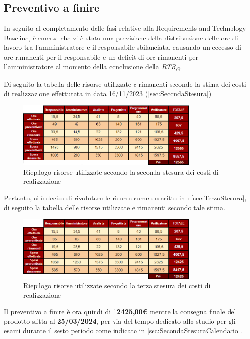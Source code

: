 \subsection{Preventivo a finire}
In seguito al completamento delle fasi relative alla Requirements and Technology Baseline, è emerso che vi è stata una previsione della distribuzione delle ore di lavoro tra l'amministratore e il responsabile sbilanciata, causando un eccesso di ore rimanenti per il responsabile e un deficit di ore rimanenti per l'amministratore al momento della conclusione della \textit{RTB}\textsubscript{\textit{G}}.

Di seguito la tabella delle risorse utilizzate e rimanenti secondo la stima dei costi di realizzazione effettutata in data 16/11/2023 (\ref{sec:SecondaStesura})
\begin{figure}[H]
    \centering
    \includegraphics[width=0.8\textwidth]{../Images/PaF1stesura.PNG}
    \caption{Riepilogo risorse utilizzate secondo la seconda stesura dei costi di realizzazione}
    \label{fig:RisorseRimanentiRTB}
\end{figure}

Pertanto, si è deciso di rivalutare le risorse come descritto in : \ref{sec:TerzaStesura},
di seguito la tabella delle risorse utilizzate e rimanenti secondo tale stima.

\begin{figure}[H]
    \centering
    \includegraphics[width=0.8\textwidth]{../Images/PaF2stesura.PNG}
    \caption{Riepilogo risorse utilizzate secondo la terza stesura dei costi di realizzazione}
    \label{fig:RisorseRimanentiRTB2}
\end{figure}    
Il preventivo a finire è ora quindi di \textbf{12425,00€} mentre la consegna finale del prodotto slitta al \textbf{25/03/2024}, per via del tempo dedicato allo studio per gli esami durante il sesto periodo come indicato in \ref{sec:SecondaStesuraCalendario}.

